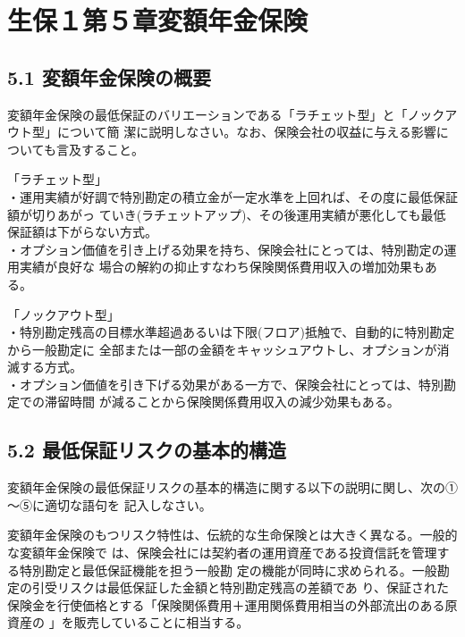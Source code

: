 \documentclass[report,gutter=10mm,fore-edge=10mm,uplatex,dvipdfmx]{jlreq}
\begin{document}
\chapter{生保１第５章変額年金保険}
\section{5.1 変額年金保険の概要}
変額年金保険の最低保証のバリエーションである「ラチェット型」と「ノックアウト型」について簡
潔に説明しなさい。なお、保険会社の収益に与える影響についても言及すること。
\answer{}

「ラチェット型」\\
・運用実績が好調で特別勘定の積立金が一定水準を上回れば、その度に最低保証額が切りあがっ
ていき(ラチェットアップ)、その後運用実績が悪化しても最低保証額は下がらない方式。\\
・オプション価値を引き上げる効果を持ち、保険会社にとっては、特別勘定の運用実績が良好な
場合の解約の抑止すなわち保険関係費用収入の増加効果もある。

「ノックアウト型」\\
・特別勘定残高の目標水準超過あるいは下限(フロア)抵触で、自動的に特別勘定から一般勘定に
全部または一部の金額をキャッシュアウトし、オプションが消滅する方式。\\
・オプション価値を引き下げる効果がある一方で、保険会社にとっては、特別勘定での滞留時間
が減ることから保険関係費用収入の減少効果もある。

\section{5.2 最低保証リスクの基本的構造}
変額年金保険の最低保証リスクの基本的構造に関する以下の説明に関し、次の①～⑤に適切な語句を
記入しなさい。\vspace{1zh}

変額年金保険のもつリスク特性は、伝統的な生命保険とは大きく異なる。一般的な変額年金保険で
は、保険会社には契約者の運用資産である投資信託を管理する特別勘定と最低保証機能を担う一般勘
定の機能が同時に求められる。一般勘定の引受リスクは最低保証した金額と特別勘定残高の差額であ
り、保証された保険金を行使価格とする「保険関係費用＋運用関係費用相当の外部流出のある原資産の
」を販売していることに相当する。
\end{document}
